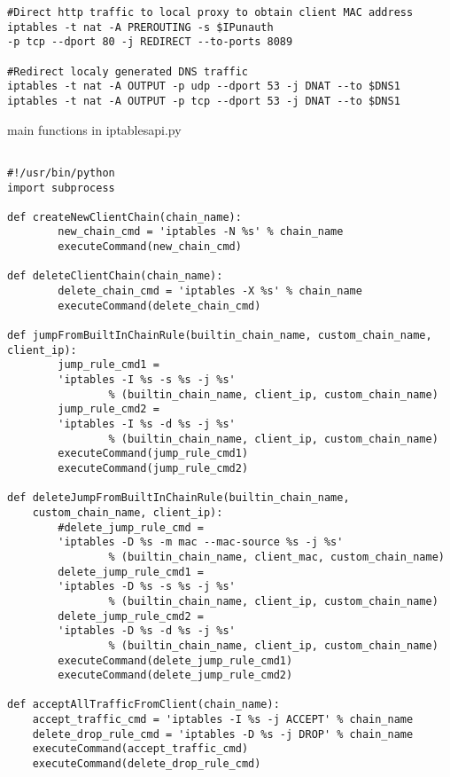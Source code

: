 \begin{appendices}
\begin{algorithm}[h]
\begin{verbatim}
#Direct http traffic to local proxy to obtain client MAC address
iptables -t nat -A PREROUTING -s $IPunauth 
-p tcp --dport 80 -j REDIRECT --to-ports 8089

#Redirect localy generated DNS traffic
iptables -t nat -A OUTPUT -p udp --dport 53 -j DNAT --to $DNS1
iptables -t nat -A OUTPUT -p tcp --dport 53 -j DNAT --to $DNS1
 \end{verbatim}
\end{algorithm}

\begin{algorithm}[h]
  \caption{main functions in iptablesapi.py}
  \label{code:iptablesapi}
  \begin{verbatim}
  
#!/usr/bin/python
import subprocess

def createNewClientChain(chain_name):
        new_chain_cmd = 'iptables -N %s' % chain_name
        executeCommand(new_chain_cmd)
        
def deleteClientChain(chain_name):
        delete_chain_cmd = 'iptables -X %s' % chain_name
        executeCommand(delete_chain_cmd)
        
def jumpFromBuiltInChainRule(builtin_chain_name, custom_chain_name, client_ip):
        jump_rule_cmd1 = 
        'iptables -I %s -s %s -j %s'  
        		% (builtin_chain_name, client_ip, custom_chain_name)
        jump_rule_cmd2 = 
        'iptables -I %s -d %s -j %s'  
        		% (builtin_chain_name, client_ip, custom_chain_name)
        executeCommand(jump_rule_cmd1)
        executeCommand(jump_rule_cmd2)

def deleteJumpFromBuiltInChainRule(builtin_chain_name, 
	custom_chain_name, client_ip):
        #delete_jump_rule_cmd = 
        'iptables -D %s -m mac --mac-source %s -j %s'  
        		% (builtin_chain_name, client_mac, custom_chain_name)  
        delete_jump_rule_cmd1 = 
        'iptables -D %s -s %s -j %s'  
        		% (builtin_chain_name, client_ip, custom_chain_name)
        delete_jump_rule_cmd2 = 
        'iptables -D %s -d %s -j %s'  
        		% (builtin_chain_name, client_ip, custom_chain_name)
        executeCommand(delete_jump_rule_cmd1)
        executeCommand(delete_jump_rule_cmd2)

def acceptAllTrafficFromClient(chain_name):
    accept_traffic_cmd = 'iptables -I %s -j ACCEPT' % chain_name
    delete_drop_rule_cmd = 'iptables -D %s -j DROP' % chain_name
    executeCommand(accept_traffic_cmd)
    executeCommand(delete_drop_rule_cmd)


\end{verbatim}
\end{algorithm}
\end{appendices}
